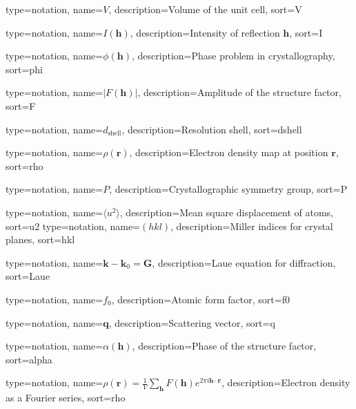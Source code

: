 {
  type=notation,
  name={\ensuremath{V}},
  description={Volume of the unit cell},
  sort={V}
}

{
  type=notation,
  name={\ensuremath{I(\mathbf{h})}},
  description={Intensity of reflection \ensuremath{\mathbf{h}}},
  sort={I}
}

{
  type=notation,
  name={\ensuremath{\phi(\mathbf{h})}},
  description={Phase problem in crystallography},
  sort={phi}
}

{
  type=notation,
  name={\ensuremath{|F(\mathbf{h})|}},
  description={Amplitude of the structure factor},
  sort={F}
}

{
  type=notation,
  name={\ensuremath{d_{\text{shell}}}},
  description={Resolution shell},
  sort={dshell}
}

{
  type=notation,
  name={\ensuremath{\rho(\mathbf{r})}},
  description={Electron density map at position \ensuremath{\mathbf{r}}},
  sort={rho}
}

{
  type=notation,
  name={\ensuremath{P}},
  description={Crystallographic symmetry group},
  sort={P}
}

{
  type=notation,
  name={\ensuremath{\langle u^2 \rangle}},
  description={Mean square displacement of atoms},
  sort={u2}
}
{
  type=notation,
  name={\ensuremath{(hkl)}},
  description={Miller indices for crystal planes},
  sort={hkl}
}

{
  type=notation,
  name={\ensuremath{\mathbf{k} - \mathbf{k}_0 = \mathbf{G}}},
  description={Laue equation for diffraction},
  sort={Laue}
}

{
  type=notation,
  name={\ensuremath{f_0}},
  description={Atomic form factor},
  sort={f0}
}

{
  type=notation,
  name={\ensuremath{\mathbf{q}}},
  description={Scattering vector},
  sort={q}
}

{
  type=notation,
  name={\ensuremath{\alpha(\mathbf{h})}},
  description={Phase of the structure factor},
  sort={alpha}
}

{
  type=notation,
  name={\ensuremath{\rho(\mathbf{r}) = \frac{1}{V} \sum_{\mathbf{h}} F(\mathbf{h}) e^{2\pi i \mathbf{h} \cdot \mathbf{r}}}},
  description={Electron density as a Fourier series},
  sort={rho}
}

